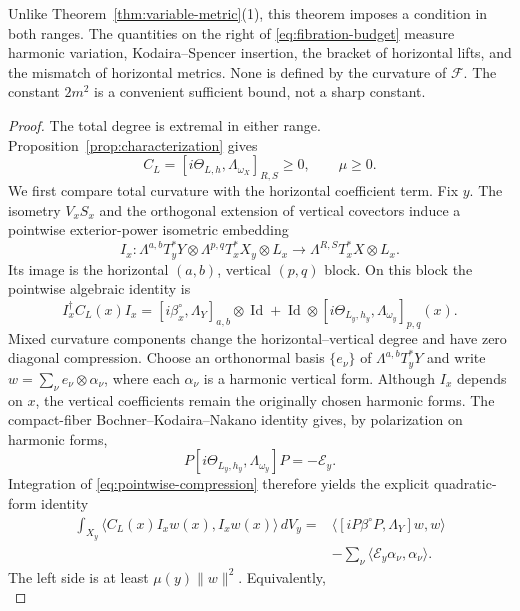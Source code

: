 \documentclass[11pt,reqno]{amsart}
\numberwithin{equation}{section}
\theoremstyle{definition}
\theoremstyle{remark}
\newcommand{\cF}{\mathcal F}
\newcommand{\Id}{\operatorname{Id}}
\newcommand{\ip}[2]{\langle #1,#2\rangle}
\begin{document}
Unlike Theorem~\ref{thm:variable-metric}(1), this theorem imposes a condition in both ranges. The quantities on the right of \eqref{eq:fibration-budget} measure harmonic variation, Kodaira--Spencer insertion, the bracket of horizontal lifts, and the mismatch of horizontal metrics. None is defined by the curvature of $\cF$. The constant $2m^2$ is a convenient sufficient bound, not a sharp constant.

\begin{proof}
The total degree is extremal in either range. Proposition~\ref{prop:characterization} gives
\[
 C_L=[i\Theta_{L,h},\Lambda_{\omega_X}]_{R,S}\geq0,
 \qquad \mu\geq0.
\]
We first compare total curvature with the horizontal coefficient term. Fix $y$. The isometry $V_xS_x$ and the orthogonal extension of vertical covectors induce a pointwise exterior-power isometric embedding
\[
 I_x:\Lambda^{a,b}T_y^*Y\otimes
       \Lambda^{p,q}T_x^*X_y\otimes L_x
       \longrightarrow\Lambda^{R,S}T_x^*X\otimes L_x.
\]
Its image is the horizontal $(a,b)$, vertical $(p,q)$ block. On this block the pointwise algebraic identity is
\begin{equation}\label{eq:pointwise-compression}
 I_x^\dagger C_L(x)I_x
  =[i\beta_x^\circ,\Lambda_Y]_{a,b}\otimes\Id
       +\Id\otimes[i\Theta_{L_y,h_y},\Lambda_{\omega_y}]_{p,q}(x).
\end{equation}
Mixed curvature components change the horizontal--vertical degree and have zero diagonal compression. Choose an orthonormal basis $\{e_\nu\}$ of $\Lambda^{a,b}T_y^*Y$ and write
$w=\sum_\nu e_\nu\otimes\alpha_\nu$, where each $\alpha_\nu$ is a harmonic vertical form. Although $I_x$ depends on $x$, the vertical coefficients remain the originally chosen harmonic forms. The compact-fiber Bochner--Kodaira--Nakano identity gives, by polarization on harmonic forms,
\[
 P[i\Theta_{L_y,h_y},\Lambda_{\omega_y}]P=-\mathcal E_y.
\]
Integration of \eqref{eq:pointwise-compression} therefore yields the explicit quadratic-form identity
\begin{equation}\label{eq:compression-quadratic-identity}
\begin{split}
 \int_{X_y}\ip{C_L(x)I_xw(x)}{I_xw(x)}\,dV_y
  ={}&\ip{[iP\beta^\circ P,\Lambda_Y]w}{w}\\
    &-\sum_\nu\ip{\mathcal E_y\alpha_\nu}{\alpha_\nu}.
\end{split}
\end{equation}
The left side is at least $\mu(y)\|w\|^2$. Equivalently,
\begin{equation}\label{eq:fibration-algebraic-compression}

\end{equation}
\end{proof}
\end{document}
